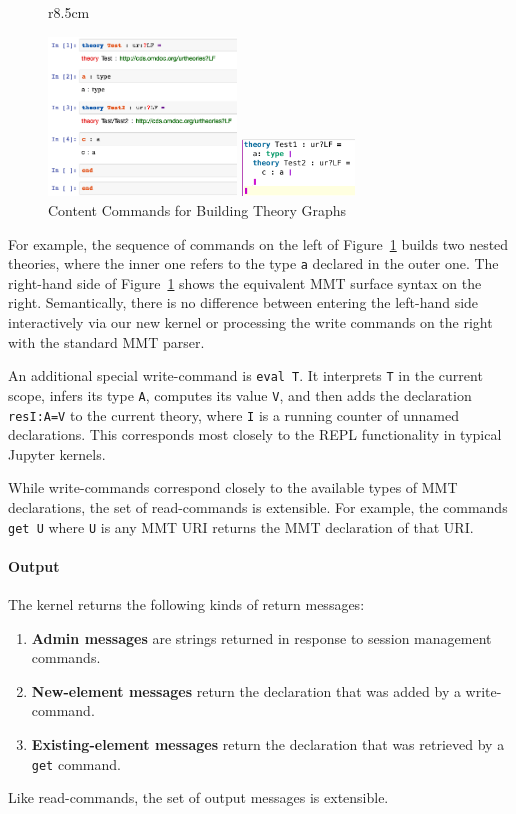 \begin{figure}r{8.5cm}%
  \begin{minipage}[c]{5cm}\includegraphics[width=5cm]{screenshots/nesting}\end{minipage}\quad
  \begin{minipage}[c]{3cm}\includegraphics[width=3cm]{../D4.11/test_theory}\end{minipage}
  \caption{Content Commands for Building Theory Graphs}\label{fig:test_theory}
  \vspace{-20pt}
\end{figure}
For example, the sequence of commands on the left of Figure~\ref{fig:test_theory} builds two nested theories, where the inner one refers to the type \texttt{a} declared in the outer one.
The right-hand side of Figure~\ref{fig:test_theory} shows the equivalent MMT surface syntax on the right.
Semantically, there is no difference between entering the left-hand side interactively via our new kernel or processing the write commands on the right with the standard MMT parser.

An additional special write-command is \texttt{eval T}.
It interprets \texttt{T} in the current scope, infers its type \texttt{A}, computes its value \texttt{V}, and then adds the declaration \texttt{resI:A=V} to the current theory, where \texttt{I} is a running counter of unnamed declarations.
This corresponds most closely to the REPL functionality in typical Jupyter kernels.

While write-commands correspond closely to the available types of MMT declarations, the set of read-commands is extensible.
For example, the commands \texttt{get U} where \texttt{U} is any MMT URI returns the MMT declaration of that URI.

\paragraph{Output}
The kernel returns the following kinds of return messages:
\begin{enumerate}
\item \textbf{Admin messages} are strings returned in response to session management commands.
\item \textbf{New-element messages} return the declaration that was added by a write-command.
\item \textbf{Existing-element messages} return the declaration that was retrieved by a \texttt{get} command.
\end{enumerate}
Like read-commands, the set of output messages is extensible.

